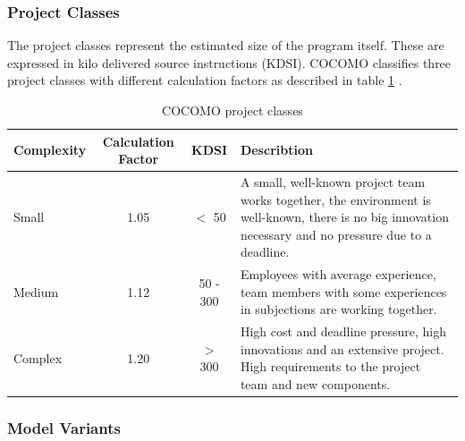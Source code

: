 \subsubsection{Project Classes}

The project classes represent the estimated size of the program itself. These are expressed in kilo delivered source instructions (KDSI). COCOMO classifies three project classes with different calculation factors as described in table \ref{tab:projectclasses} \cite{sommerville}.

\begin{table}[h]
	\centering 
	\setlength{\tabcolsep}{4pt}
	\begin{tabular}{|l||c|c|p{6cm}|}\hline
		Complexity	& Calculation Factor& KDSI 	& Describtion\\ \hline\hline
		Small   	& 1.05        		& $<$ 50  			& A small, well-known project team works together, the environment is well-known, there is no big innovation necessary and no pressure due to a deadline.\\ \hline
		Medium 		& 1.12        		& 50 - 300 			& Employees with average experience, team members with some experiences in subjections are working together.  \\ \hline
		Complex 	& 1.20 				& $>$ 300 			& High cost and deadline pressure, high innovations and an extensive project. High requirements to the project team and new components.  \\ \hline
	\end{tabular} 
	\caption{COCOMO project classes} 
	\label{tab:projectclasses} 
\end{table}

\subsubsection{Model Variants}

